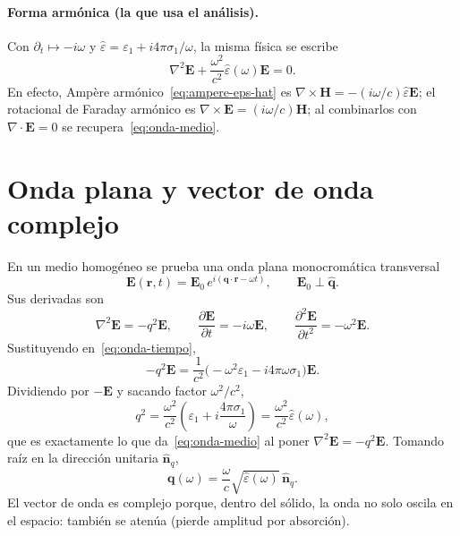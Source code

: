 \paragraph{Forma arm\'onica (la que usa el an\'alisis).}
Con $\partial_t\mapsto -i\omega$ y $\hat\varepsilon=\varepsilon_1+i 4\pi\sigma_1/\omega$,
la misma f\'isica se escribe
\begin{equation}
\label{eq:onda-medio}
\nabla^{2}\mathbf{E}+\frac{\omega^{2}}{c^{2}}\hat\varepsilon(\omega)\mathbf{E}=0.
\end{equation}
En efecto, Amp\`ere arm\'onico~\eqref{eq:ampere-eps-hat} es $\nabla\times\mathbf{H}=-(i\omega/c)\hat\varepsilon\mathbf{E}$;
el rotacional de Faraday arm\'onico es $\nabla\times\mathbf{E}=(i\omega/c)\mathbf{H}$;
al combinarlos con $\nabla\cdot\mathbf{E}=0$ se recupera~\eqref{eq:onda-medio}.

\section{Onda plana y vector de onda complejo}

En un medio homog\'eneo se prueba una onda plana monocrom\'atica transversal
\begin{equation}
\label{eq:onda-plana}
\mathbf{E}(\mathbf{r},t)=\mathbf{E}_{0}\,e^{i(\mathbf{q}\cdot\mathbf{r}-\omega t)},
\qquad \mathbf{E}_{0}\perp\hat{\mathbf{q}}.
\end{equation}
Sus derivadas son
\begin{equation}
\nabla^{2}\mathbf{E}=-q^{2}\mathbf{E},
\qquad
\frac{\partial\mathbf{E}}{\partial t}=-i\omega\mathbf{E},
\qquad
\frac{\partial^{2}\mathbf{E}}{\partial t^{2}}=-\omega^{2}\mathbf{E}.
\end{equation}
Sustituyendo en~\eqref{eq:onda-tiempo},
\begin{equation}
-q^{2}\mathbf{E}
=\frac{1}{c^{2}}\bigl(-\omega^{2}\varepsilon_1-i 4\pi\omega\sigma_1\bigr)\mathbf{E}.
\end{equation}
Dividiendo por $-\mathbf{E}$ y sacando factor $\omega^{2}/c^{2}$,
\begin{equation}
\label{eq:q2-eps}
q^{2}
=\frac{\omega^{2}}{c^{2}}\left(\varepsilon_1+i\frac{4\pi\sigma_1}{\omega}\right)
=\frac{\omega^{2}}{c^{2}}\hat\varepsilon(\omega),
\end{equation}
que es exactamente lo que da~\eqref{eq:onda-medio} al poner $\nabla^{2}\mathbf{E}=-q^{2}\mathbf{E}$.
Tomando ra\'iz en la direcci\'on unitaria $\hat{\mathbf{n}}_q$,
\begin{equation}
\label{eq:q-vector}
\mathbf{q}(\omega)=\frac{\omega}{c}\sqrt{\hat\varepsilon(\omega)}\,\hat{\mathbf{n}}_q.
\end{equation}
El vector de onda es complejo porque, dentro del s\'olido, la onda no solo oscila en el espacio: tambi\'en se aten\'ua (pierde amplitud por absorci\'on).

